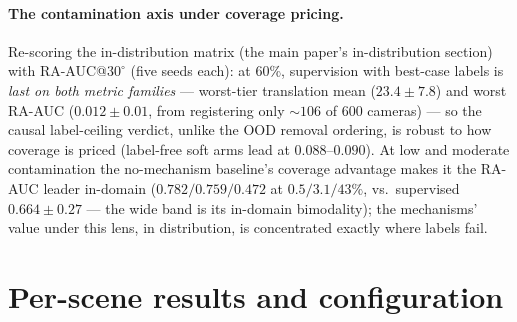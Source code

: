 \documentclass[10pt,twocolumn,letterpaper]{article}
\begin{document}
\paragraph{The contamination axis under coverage pricing.} Re-scoring the
in-distribution matrix (the main paper's in-distribution section) with RA-AUC@$30^{\circ}$ (five seeds
each): at $60\%$, supervision with best-case labels is \emph{last on both metric
families} --- worst-tier translation mean ($23.4\pm7.8$) and worst RA-AUC
($0.012\pm0.01$, from registering only ${\sim}106$ of $600$ cameras) --- so the
causal label-ceiling verdict, unlike the OOD removal ordering, is robust to how
coverage is priced (label-free soft arms lead at $0.088$--$0.090$). At low and
moderate contamination the no-mechanism baseline's coverage advantage makes it the
RA-AUC leader in-domain ($0.782/0.759/0.472$ at $0.5/3.1/43\%$, vs.\ supervised
$0.664\pm0.27$ --- the wide band is its in-domain bimodality); the mechanisms'
value under this lens, in distribution, is concentrated exactly where labels
fail.

\section{Per-scene results and configuration}\label{app:perscene}
\end{document}
